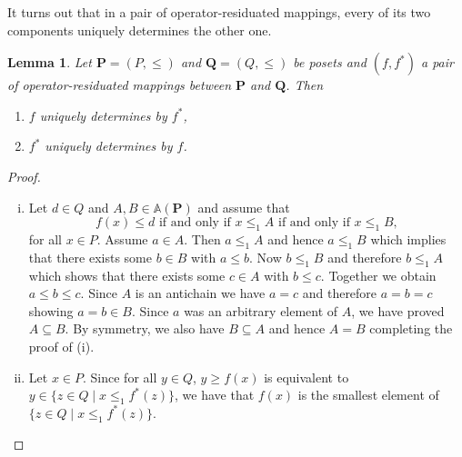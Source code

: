 \documentclass[12pt]{article}
\newtheorem{lemma}[theorem]{Lemma}
\begin{document}
It turns out that in a pair of operator-residuated mappings, every of its two components uniquely determines the other one.

\begin{lemma}\label{lem3}
Let $\mathbf P=(P,\le)$ and $\mathbf Q=(Q,\le)$ be posets and $(f,f^*)$ a pair of operator-residuated mappings between $\mathbf P$ and $\mathbf Q$. Then
\begin{enumerate}[{\rm(i)}]
\item $f$ uniquely determines by $f^*$,
\item $f^*$ uniquely determines by $f$.
\end{enumerate}
\end{lemma}

\begin{proof}
$\text{}$	
\begin{enumerate}[(i)]
\item Let $d\in Q$ and $A,B\in\mathbb A(\mathbf P)$ and assume that
\[
f(x)\le d\text{ if and only if }x\le_1A\text{ if and only if }x\le_1B,
\]
for all $x\in P$. Assume $a\in A$. Then $a\le_1A$ and hence $a\le_1B$ which implies that there exists some $b\in B$ with $a\le b$. Now $b\le_1B$ and therefore $b\le_1A$ which shows that there exists some $c\in A$ with $b\le c$. Together we obtain $a\le b\le c$. Since $A$ is an antichain we have $a=c$ and therefore $a=b=c$ showing $a=b\in B$. Since $a$ was an arbitrary element of $A$, we have proved $A\subseteq B$. By symmetry, we also have $B\subseteq A$ and hence $A=B$ completing the proof of (i).
\item Let $x\in P$. Since for all $y\in Q$, $y\ge f(x)$ is equivalent to $y\in\{z\in Q\mid x\le_1f^*(z)\}$, we have that $f(x)$ is the smallest element of $\{z\in Q\mid x\le_1f^*(z)\}$.
\end{enumerate}
\end{proof}
\end{document}

